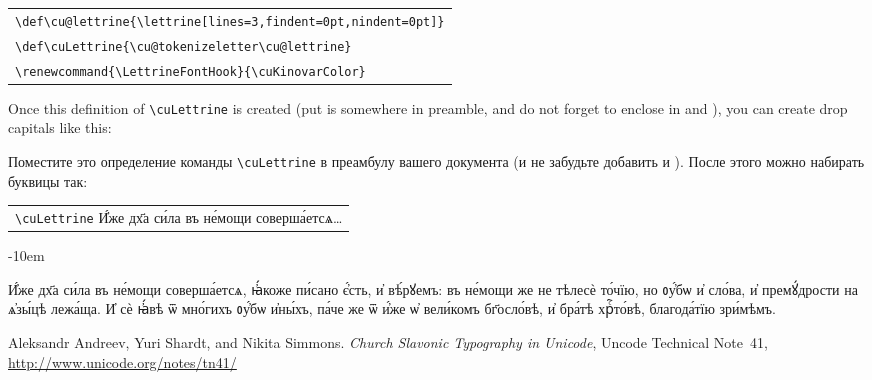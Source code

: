 \begin{center}
\begin{churchslavonic}
\begin{tabular}{l}
\verb+\def\cu@lettrine{\lettrine[lines=3,findent=0pt,nindent=0pt]}+\\
\verb+\def\cuLettrine{\cu@tokenizeletter\cu@lettrine}+\\
\verb+\renewcommand{\LettrineFontHook}{\cuKinovarColor}+\\
\end{tabular}
\end{churchslavonic}
\end{center}

\begin{EN}
Once this definition of \verb+\cuLettrine+ is created (put is somewhere in preamble, and do not forget to enclose in  and ),
you can create drop capitals like this:
\end{EN}
%
\begin{RU}
Поместите это определение команды \verb+\cuLettrine+ в преамбулу вашего документа (и не забудьте добавить  и ).
После этого можно набирать буквицы так:
\end{RU}
%
\begin{center}
\begin{churchslavonic}
\begin{tabular}{l}
\verb+\cuLettrine+ И҆́же дх҃а си́ла въ не́мощи соверша́етсѧ\ldots\\
\end{tabular}
\end{churchslavonic}
\end{center}

\begin{churchslavonic}
\lineskiplimit-10em

\cuLettrine 
И҆́же дх҃а си́ла въ не́мощи соверша́етсѧ, ꙗ҆́коже пи́сано є҆́сть, и҆ вѣ́рꙋемъ: въ не́мощи же не тѣлесѐ то́чїю, но ᲂу҆́бѡ и҆ сло́ва, 
и҆ премꙋ́дрости на ѧ҆зы́цѣ лежа́ща. И҆ сѐ ꙗ҆́вѣ ѿ мно́гихъ ᲂу҆́бѡ и҆ны́хъ, па́че же ѿ и҆́же ѡ҆ вели́комъ бг҃осло́вѣ, и҆ бра́тѣ хрⷭ҇то́вѣ, 
благода́тїю зри́мѣмъ.

\end{churchslavonic}

\begin{thebibliography}{9}

  Aleksandr Andreev, Yuri Shardt, and Nikita Simmons.
  \emph{Church Slavonic Typography in Unicode},
  Uncode Technical Note~41,
  \url{http://www.unicode.org/notes/tn41/}

\end{thebibliography}


